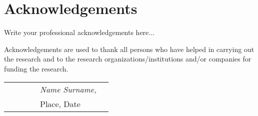 \section*{Acknowledgements}

Write your professional acknowledgements here... 

Acknowledgements are used to thank all persons who have helped in carrying out the research and to the research organizations/institutions and/or companies for funding the research. 

\begin{table}[hb]
\begin{tabular}{lp{6.67cm}llll}
& & & & \textit{Name Surname,} \\
& & & & Place, Date
\end{tabular}
\end{table}




